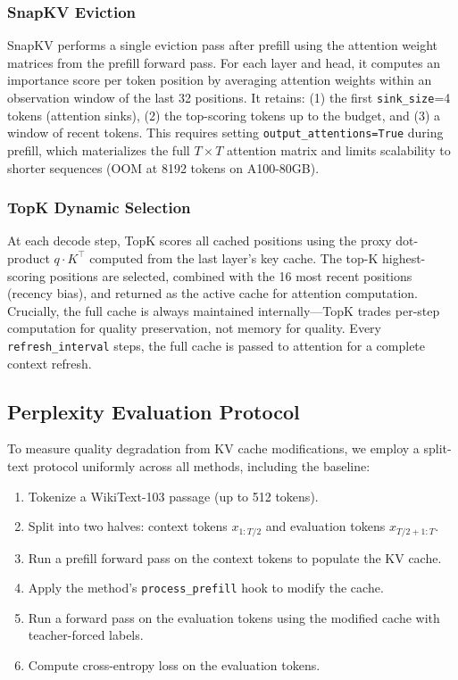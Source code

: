 \documentclass[conference]{IEEEtran}
\begin{document}
\subsubsection{SnapKV Eviction}
SnapKV performs a single eviction pass after prefill using the attention weight matrices from the prefill forward pass. For each layer and head, it computes an importance score per token position by averaging attention weights within an observation window of the last 32 positions. It retains: (1) the first \texttt{sink\_size}=4 tokens (attention sinks), (2) the top-scoring tokens up to the budget, and (3) a window of recent tokens. This requires setting \texttt{output\_attentions=True} during prefill, which materializes the full $T \times T$ attention matrix and limits scalability to shorter sequences (OOM at 8192 tokens on A100-80GB).

\subsubsection{TopK Dynamic Selection}
At each decode step, TopK scores all cached positions using the proxy dot-product $q \cdot K^{\top}$ computed from the last layer's key cache. The top-K highest-scoring positions are selected, combined with the 16 most recent positions (recency bias), and returned as the active cache for attention computation. Crucially, the full cache is always maintained internally---TopK trades per-step computation for quality preservation, not memory for quality. Every \texttt{refresh\_interval} steps, the full cache is passed to attention for a complete context refresh.

\subsection{Perplexity Evaluation Protocol}

To measure quality degradation from KV cache modifications, we employ a split-text protocol uniformly across all methods, including the baseline:

\begin{enumerate}
    \item Tokenize a WikiText-103 passage (up to 512 tokens).
    \item Split into two halves: context tokens $x_{1:T/2}$ and evaluation tokens $x_{T/2+1:T}$.
    \item Run a prefill forward pass on the context tokens to populate the KV cache.
    \item Apply the method's \texttt{process\_prefill} hook to modify the cache.
    \item Run a forward pass on the evaluation tokens using the modified cache with teacher-forced labels.
    \item Compute cross-entropy loss on the evaluation tokens.
\end{enumerate}
\end{document}
